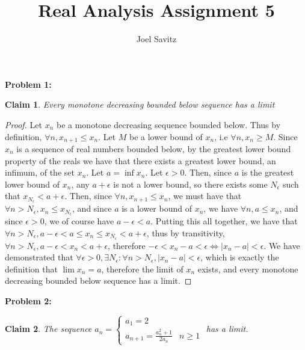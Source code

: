 \documentclass{article}
\title{Real Analysis Assignment 5}
\author{Joel Savitz}
\newcommand{\eps}{\ensuremath{\epsilon}}
\newtheorem{clm}{Claim}
\begin{document}
\maketitle

\textbf{Problem 1:}

\begin{clm}
	Every monotone decreasing bounded below sequence has a limit
\end{clm}

\begin{proof}
	Let $x_n$ be a monotone decreasing sequence bounded below.
	Thus by definition, $\forall n, x_{n+1} \le x_n$.
	Let $M$ be a lower bound of $x_n$, i.e $\forall n, x_n \geq M$.
	Since $x_n$ is a sequence of real numbers bounded below,
	by the greatest lower bound property of the reals we have that there exists
	a greatest lower bound, an infimum, of the set $x_n$.
	Let $a = \inf x_n$.
	Let $\eps > 0$.
	Then, since $a$ is the greatest lower bound of $x_n$,
	any $a + \eps$ is not a lower bound, so
	there exists some $N_\eps$ such that $x_{N_\eps} < a + \eps$.
	Then, since $\forall n, x_{n+1} \le x_n$,
	we must have that $\forall n > N_\eps, x_n \le x_{N_\eps}$,
	and since $a$ is a lower bound of $x_n$,
	we have $\forall n, a \le x_n$, and since $\eps > 0$,
	we of course have $a - \eps < a$.
	Putting this all together,
	we have that $\forall n > N_\eps, a - \eps < a \le x_n \le x_{N_\eps} < a + \eps$,
	thus by transitivity, $\forall n > N_\eps, a - \eps < x_n < a + \eps$,
	therefore $-\eps < x_n - a < \eps \iff | x_n - a | < \eps$.
	We have demonstrated that
	$\forall \eps > 0, \exists N_\eps: \forall n > N_\eps, | x_n - a | < \eps$,
	which is exactly the definition that $\lim x_n = a$,
	therefore the limit of $x_n$ exists,
	and every monotone decreasing bounded below sequence has a limit.
\end{proof}

\textbf{Problem 2:}


\begin{clm}
	The sequence $a_n = \begin{cases} a_1 = 2 \\ a_{n+1} = \frac{a_n^2 + 1}{2a_n} & n \geq 1 \end{cases}$ has a limit.
\end{clm}
\end{document}
